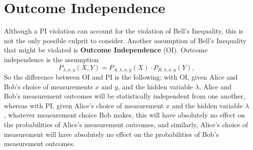 \section{Outcome Independence\label{OISec}}

Although a PI violation can account for the violation of Bell's Inequality, this is not the only possible culprit to consider. Another assumption of Bell's Inequality that might be violated is \textbf{Outcome Independence} (OI). Outcome independence is the assumption
\begin{equation}\label{OI}
P_{\lambda,x,y}(X,Y)=P_{A,\lambda,x,y}(X)\cdot P_{B,\lambda,x,y}(Y),
\end{equation}
So the difference between OI and PI is the following: with OI, given Alice and Bob's choice of measurements $x$ and $y$, and the hidden variable $\lambda$, Alice and Bob's measurement outcomes will be statistically independent from one another, whereas with PI, given Alice's choice of measurement $x$ and the hidden variable $\lambda$, whatever measurement choice Bob makes, this will have absolutely no effect on the probabilities of Alice's measurement outcomes, and similarly, Alice's choice of measurement will have absolutely no effect on the probabilities of Bob's measurement outcomes. 

